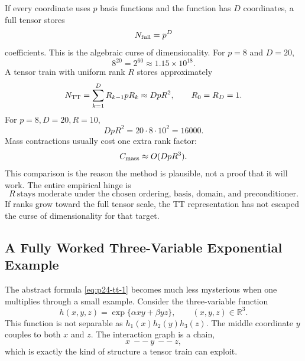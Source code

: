 \documentclass[11pt]{article}
\numberwithin{equation}{section}
\newcommand{\R}{\mathbb R}
\begin{document}
If every coordinate uses \(p\) basis functions and the function has \(D\)
coordinates, a full tensor stores
\begin{equation}
    N_{\rm full}=p^D
    \label{eq:p24-p23-rank1}
\end{equation}
coefficients.  This is the algebraic curse of dimensionality.  For \(p=8\) and
\(D=20\),
\begin{equation}
    8^{20}=2^{60}\approx 1.15\times 10^{18}.
    \label{eq:p24-p23-rank2}
\end{equation}
A tensor train with uniform rank \(R\) stores approximately
\begin{equation}
    N_{\rm TT}
    =
    \sum_{k=1}^D R_{k-1}pR_k
    \approx DpR^2,
    \qquad R_0=R_D=1.
    \label{eq:p24-p23-rank3}
\end{equation}
For \(p=8,D=20,R=10\),
\begin{equation}
    DpR^2=20\cdot 8\cdot 10^2=16000.
    \label{eq:p24-p23-rank4}
\end{equation}
Mass contractions usually cost one extra rank factor:
\begin{equation}
    C_{\rm mass}\approx O(DpR^3).
    \label{eq:p24-p23-rank5}
\end{equation}
This comparison is the reason the method is plausible, not a proof that it
will work.  The entire empirical hinge is
\begin{equation}
    R\ \text{stays moderate under the chosen ordering, basis, domain, and
    preconditioner.}
    \label{eq:p24-p23-rank6}
\end{equation}
If ranks grow toward the full tensor scale, the TT representation has not
escaped the curse of dimensionality for that target.

\subsection*{A Fully Worked Three-Variable Exponential Example}
\label{subsec:p30-worked-tt-exponential}

The abstract formula \eqref{eq:p24-tt-1} becomes much less mysterious when one
multiplies through a small example.  Consider the three-variable function
\begin{equation}
    h(x,y,z)
    =
    \exp\{\alpha xy+\beta yz\},
    \qquad (x,y,z)\in\R^3.
    \label{eq:p30-tt-example-1}
\end{equation}
This function is not separable as \(h_1(x)h_2(y)h_3(z)\).  The middle
coordinate \(y\) couples to both \(x\) and \(z\).  The interaction graph is a
chain,
\[
    x\ --\ y\ --\ z,
\]
which is exactly the kind of structure a tensor train can exploit.
\end{document}
